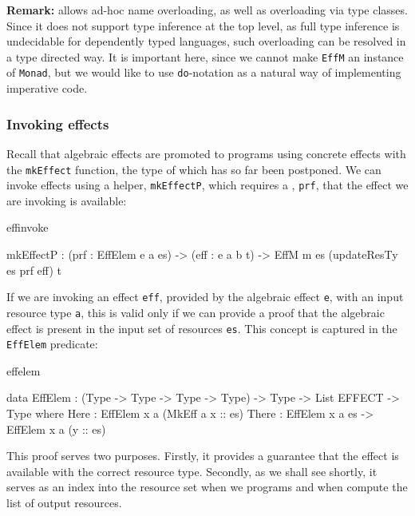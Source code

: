 \textbf{Remark:} \Idris{} allows ad-hoc name overloading, as well as overloading via type classes.
Since it does not support type inference at the top level, as full type inference
is undecidable for dependently typed languages, such overloading can be
resolved in a type directed way.
It is important here, since we cannot make
\texttt{EffM} an instance of \texttt{Monad}, but we would like to use
\texttt{do}-notation as a natural way of implementing imperative code.

\subsubsection{Invoking effects}

Recall that algebraic effects are promoted to \Eff{} programs using concrete
effects with the \texttt{mkEffect} function, the type of which has so far
been postponed. We can invoke effects using a helper, \texttt{mkEffectP}, which
requires a , \texttt{prf},
that the effect we are invoking is available:

\begin{SaveVerbatim}{effinvoke}

mkEffectP : (prf : EffElem e a es) -> 
            (eff : e a b t) -> 
            EffM m es (updateResTy es prf eff) t

\end{SaveVerbatim}

\noindent
If we are invoking an effect \texttt{eff}, provided by the algebraic effect
\texttt{e}, with an input resource type \texttt{a},
this is valid only if we can provide a proof that the algebraic effect is
present in the input set of resources \texttt{es}. This concept is captured
in the \texttt{EffElem} predicate:

\begin{SaveVerbatim}{effelem}

data EffElem : (Type -> Type -> Type -> Type) -> 
               Type -> List EFFECT -> Type where
     Here : EffElem x a (MkEff a x :: es)
     There : EffElem x a es -> EffElem x a (y :: es)

\end{SaveVerbatim}

\noindent
This proof serves two purposes. Firstly, it provides a guarantee that the effect
is available with the correct resource type. Secondly, as we shall see shortly,
it serves as an index into the resource set when we  programs
and when compute the list of output resources.


